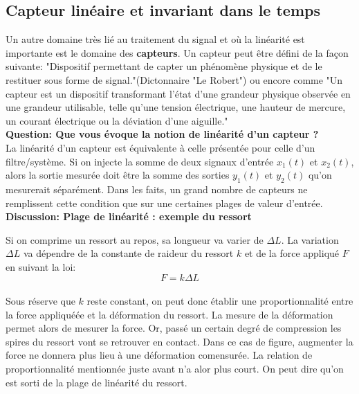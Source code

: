 \documentclass[11pt,a4paper]{article}
\begin{document}
\subsection{Capteur linéaire et invariant dans le temps}
Un autre domaine très lié au traitement du signal et où la linéarité est importante est le domaine des \textbf{capteurs}. Un capteur peut être défini de la façon suivante: "Dispositif permettant de capter un phénomène physique et de le restituer sous forme de signal."(Dictonnaire "Le Robert") ou encore comme "Un capteur est un dispositif transformant l'état d'une grandeur physique observée en une grandeur utilisable, telle qu'une tension électrique, une hauteur de mercure, un courant électrique ou la déviation d'une aiguille."\\

\textbf{Question: Que vous évoque la notion de linéarité d'un capteur ?}\\

La linéarité d'un capteur est équivalente à celle présentée pour celle d'un filtre/système. Si on injecte la somme de deux signaux d'entrée $x_1(t)$ et $x_2(t)$, alors la sortie mesurée doit être la somme des sorties $y_1(t)$ et $y_2(t)$ qu'on mesurerait séparément. Dans les faits, un grand nombre de capteurs ne remplissent cette condition que sur une certaines plages de valeur d'entrée.\\

\textbf{Discussion: Plage de linéarité : exemple du ressort \label{ressort}}

Si on comprime un ressort au repos, sa longueur va varier de $\Delta L$. La variation $\Delta L$ va dépendre de la constante de raideur du ressort $k$ et de la force appliqué $F$ en suivant la loi: \\

\[ F = k \Delta L\]\\

Sous réserve que $k$ reste constant, on peut donc établir une proportionnalité entre la force appliquéée et la déformation du ressort. La mesure de la déformation permet alors de mesurer la force. Or, passé un certain degré de compression les spires du ressort vont se retrouver en contact. Dans ce cas de figure, augmenter la force ne donnera plus lieu à une déformation comensurée. La relation de proportionnalité mentionnée juste avant n'a alor plus court. On peut dire qu'on est sorti de la plage de linéarité du ressort.
\end{document}
